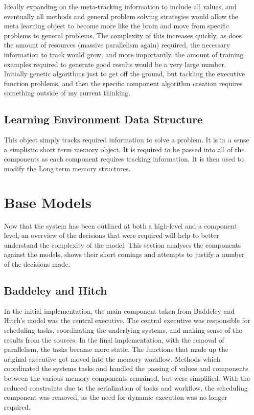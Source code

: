 Ideally expanding on the meta-tracking information to include all values, and eventually all methods and general problem solving strategies would allow the meta learning object to become more like the brain and move from specific problems to general problems.  The complexity of this increases quickly, as does the amount of resources (massive parallelism again) required, the necessary information to track would grow, and more importantly, the amount of training examples required to generate good results would be a very large number. Initially genetic algorithms just to get off the ground, but tackling the executive function problems, and then the specific component algorithm creation requires something outside of my current thinking.

\subsection{Learning Environment Data Structure} 
This object simply tracks required information to solve a problem.  It is in a sense a simplistic short term memory object.  It is required to be passed into all of the components as each component requires tracking information.  It is then used to modify the Long term memory structures.

\section{Base Models}

Now that the system has been outlined at both a high-level and a component level, an overview of the decisions that were required will help to better understand the complexity of the model. This section analyses the components against the models, shows their short comings and attempts to justify a number of the decisions made.

\subsection{Baddeley and Hitch}

In the initial implementation, the main component taken from Baddeley and Hitch's model was the central executive.  The central executive was responsible for scheduling tasks, coordinating the underlying systems, and making sense of the results from the sources.  In the final implementation, with the removal of parallelism, the tasks became more static.  The functions that made up the original executive got moved into the memory workflow.  Methods which coordinated the systems tasks and handled the passing of values and components between the various memory components remained, but were simplified.  With the reduced constraints due to the serialization of tasks and workflow, the scheduling component was removed, as the need for dynamic execution was no longer required.

